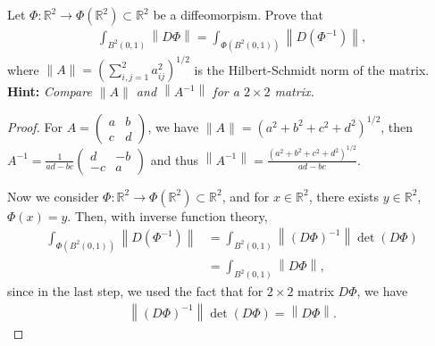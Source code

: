 \documentclass[11pt]{article}
\theoremstyle{definition}
\numberwithin{equation}{subsection}
\begin{document}
Let $\Phi: \mathbb{R}^2 \to \Phi\left(\mathbb{R}^2\right) \subset \mathbb{R}^2$ be a diffeomorpism. Prove that
\begin{align*}
    \int_{B^2(0,1)} \left\|D\Phi \right\| = \int_{\Phi(B^2(0,1))} \left\|D\left(\Phi^{-1}\right) \right\|,
\end{align*}
where $\|A\| = \left(\sum^2_{i,j=1} a_{ij}^2\right)^{1/2}$ is the Hilbert-Schmidt norm of the matrix.\\
{\bf Hint:} {\em Compare $\|A\|$ and $\left\|A^{-1}\right\|$ for a $2 \times 2$ matrix.}
\begin{proof}
For $A = \begin{pmatrix} 
    a & b \\
    c & d
\end{pmatrix}$, we have $\|A\| = \left(a^2 + b^2 + c^2 + d^2\right)^{1/2}$, then $A^{-1} = \frac{1}{ad - bc}\begin{pmatrix} 
    d & -b \\
    -c & a
\end{pmatrix}$ and thus $\left\|A^{-1}\right\| = \frac{\left(a^2 + b^2 + c^2 + d^2\right)^{1/2}}{ad - bc}$. 

Now we consider $\Phi: \mathbb{R}^2 \to \Phi\left(\mathbb{R}^2\right) \subset \mathbb{R}^2$, and for $x \in \mathbb{R}^2$, there exists $y \in \mathbb{R}^2$, $\Phi(x) = y$. Then, with inverse function theory,
\begin{align*}
    \int_{\Phi(B^2(0,1))} \left\|D\left(\Phi^{-1}\right) \right\| & = \int_{B^2(0,1)} \left\|\left(D\Phi\right)^{-1} \right\| \det (D\Phi) \\
    & = \int_{B^2(0,1)} \left\|D\Phi \right\|,
\end{align*}
since in the last step, we used the fact that for $2 \times 2$ matrix $D\Phi$, we have
\begin{align*}
    \left\|\left(D\Phi\right)^{-1} \right\| \det (D\Phi) = \left\|D\Phi \right\|.
\end{align*}
\end{proof}







\newpage


\end{document}
